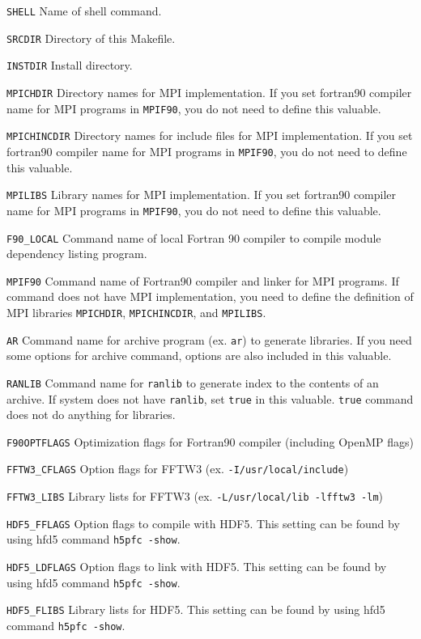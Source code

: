 \begin{description}
\item{\verb|SHELL|}    Name of shell command.
\item{\verb|SRCDIR|}   Directory of this Makefile. 
\item{\verb|INSTDIR|}  Install directory.
\item{\verb|MPICHDIR|} Directory names for MPI implementation. If you set fortran90 compiler name for MPI programs in \verb|MPIF90|, you do not need to define this valuable.
\item{\verb|MPICHINCDIR|} Directory names for include files for MPI implementation. If you set fortran90 compiler name for MPI programs in \verb|MPIF90|, you do not need to define this valuable.
\item{\verb|MPILIBS|}   Library names for MPI implementation. If you set fortran90 compiler name for MPI programs in \verb|MPIF90|, you do not need to define this valuable.
\item{\verb|F90_LOCAL|} Command name of local Fortran 90 compiler to compile module dependency listing program.
\item{\verb|MPIF90|} Command name of Fortran90 compiler and linker for MPI programs. If command does not have MPI implementation, you need to define the definition of MPI libraries \verb|MPICHDIR|, \verb|MPICHINCDIR|, and \verb|MPILIBS|.
\item{\verb|AR|}     Command name for archive program (ex. \verb|ar|) to generate libraries. If you need some options for archive command, options are also included in this valuable.
\item{\verb|RANLIB|} Command name for \verb|ranlib| to generate index to the contents of an archive. If system does not have \verb|ranlib|, set \verb|true| in this valuable. \verb|true| command does not do anything for libraries.
\item{}
\item{\verb|F90OPTFLAGS|}  Optimization flags for Fortran90 compiler (including OpenMP flags)
\item{\verb|FFTW3_CFLAGS|} Option flags for FFTW3  (ex.  \verb|-I/usr/local/include|)
\item{\verb|FFTW3_LIBS|}   Library lists for FFTW3 (ex. \verb|-L/usr/local/lib -lfftw3 -lm|)
\item{\verb|HDF5_FFLAGS|}  Option flags to compile with HDF5. This setting can be found by using hfd5 command \verb|h5pfc -show|.

\item{\verb|HDF5_LDFLAGS|}    Option flags  to link with  HDF5. This setting can be found by using hfd5 command \verb|h5pfc -show|.

\item{\verb|HDF5_FLIBS|}   Library lists for HDF5. This setting can be found by using hfd5 command \verb|h5pfc -show|.

\end{description}
%

